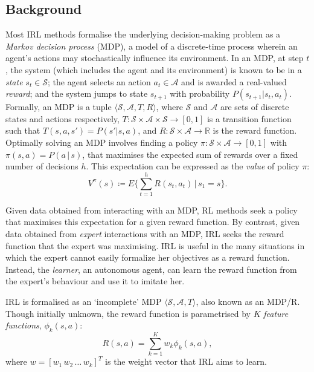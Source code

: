 \documentclass[a4paper,11pt]{report}
\begin{document}
\subsection{Background}
Most IRL methods formalise the underlying decision-mak\-ing problem as a \emph{Markov decision process} (MDP), a model of a discrete-time process wherein an agent's actions may stochastically influence its environment. In an MDP, at step $t$, the system (which includes the agent and its environment) is known to be in a \emph{state} $s_t\in\mathcal{S}$; the agent selects an action $a_t\in\mathcal{A}$ and is awarded a real-valued \emph{reward}; and the system jumps to state $s_{t+1}$ with probability $P(s_{t+1}|s_t,a_t)$. Formally, an MDP is a tuple $\langle\mathcal{S},\mathcal{A},T,R\rangle$, where $\mathcal{S}$ and $\mathcal{A}$ are sets of discrete states and actions respectively, $T:\mathcal{S}\times\mathcal{A}\times\mathcal{S}\rightarrow [0,1]$ is a transition function such that $T(s,a,s')=P(s'|s,a)$, and $R:\mathcal{S}\times\mathcal{A}\rightarrow\mathbb R$ is the reward function. 
Optimally solving an MDP involves finding a policy $\pi:\mathcal{S}\times\mathcal{A}\rightarrow[0,1]$ with $\pi(s,a) = P(a\,|\,s)$, that maximises the expected sum of rewards over a fixed number of decisions $h$. This expectation can be expressed as the \emph{value} of policy $\pi$:
\begin{equation}
\label{eq:value}
 V^\pi(s) \coloneqq E\{\sum_{t = 1}^hR(s_t,a_t)\,\vert\, s_1 = s\}.
\end{equation}

Given data obtained from interacting with an MDP, RL methods seek a policy that maximises this expectation for a given reward function.  By contrast, given data obtained from \emph{expert} interactions with an MDP, IRL seeks the reward function that the expert was maximising.  IRL is useful in the many situations in which the expert cannot easily formalize her objectives as a reward function.  Instead, the \emph{learner}, an autonomous agent, can learn the reward function from the expert's behaviour and use it to imitate her.

IRL is formalised as an `incomplete' MDP $\langle\mathcal{S},\mathcal{A},T\rangle$, also known as an MDP/R. Though initially unknown, the reward function is parametrised by $K$ \emph{feature functions}, $\phi_k(s,a)$:
\begin{equation}
R(s,a) = \sum_{k=1}^Kw_k\phi_k(s,a), \label{eq:rew}
\end{equation}
where $w=[w_1\,w_2\,\ldots\,w_k]^T$ is the weight vector that IRL aims to learn.
\end{document}
